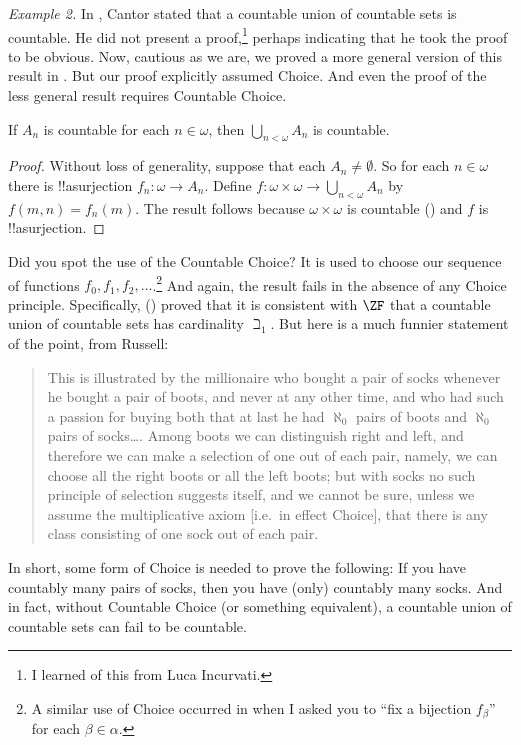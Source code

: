 \documentclass[../../../include/open-logic-section]{subfiles}
\begin{document}
\emph{Example 2.} In \citeyear{Cantor1878}, Cantor stated that {a countable union of countable sets is countable}. He did not present a proof,\footnote{I learned of this from Luca Incurvati.}  perhaps indicating that he took the proof to be obvious. Now, cautious as we are, we proved a more general version of this result in .  But our proof explicitly assumed Choice. And even the proof of the less general result requires Countable Choice.
\begin{thm} If $A_n$ is countable for each $n \in \omega$, then $\bigcup_{n < \omega} A_n$ is countable.
\end{thm}\noindent 
	\begin{proof}
		Without loss of generality, suppose that each $A_n \neq \emptyset$. So for each $n \in \omega$ there is !!a{surjection} $f_n \colon \omega  \to A_n$. Define $f \colon \omega \times \omega \to \bigcup_{n < \omega} A_n$ by $f(m, n) = f_n(m)$. The result follows because $\omega \times \omega$ is countable () and $f$ is !!a{surjection}.
\end{proof}\noindent
Did you spot the use of the Countable Choice? It is used to choose our sequence of functions $f_0, f_1, f_2, \ldots$.\footnote{A similar use of Choice occurred in  when I asked you to ``fix a bijection $f_\beta$'' for each $\beta \in \alpha$.} And again, the result fails in the absence of any Choice principle. Specifically, \citeauthor{FefermanLevy1963} (\citeyear{FefermanLevy1963}) proved that it is consistent with $\ZF$ that a countable union of countable sets has cardinality $\beth_1$. But here is a much funnier statement of the point, from Russell:
\begin{quote}
	This is illustrated by the millionaire who bought a pair of socks whenever he bought a pair of boots, and never at any other time, and who had such a passion for buying both that at last he had $\aleph_0$ pairs of boots and $\aleph_0$ pairs of socks\ldots. Among boots we can distinguish right and left, and therefore we can make a selection of one out of each pair, namely, we can choose all the right boots or all the left boots; but with socks no such principle of selection suggests itself, and we cannot be sure, unless we assume the multiplicative axiom [i.e.\ in effect Choice], that there is any class consisting of one sock out of each pair. \citep[126]{Russell1919}
\end{quote}
In short, some form of Choice is needed to prove the following: If you have countably many pairs of socks, then you have (only) countably many socks. And in fact, without Countable Choice (or something equivalent), a countable union of countable sets can fail to be countable. 
\end{document}
